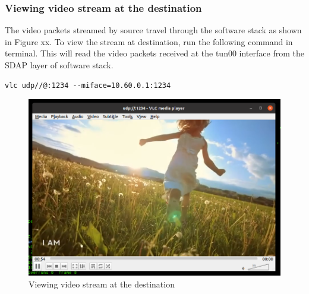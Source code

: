 \subsubsection{Viewing video stream at the destination}
The video packets streamed by source travel through the software stack as shown in Figure xx.
To view the stream at destination, run the following command in terminal. This will read the video packets received at the tun00 interface from the SDAP layer of software stack.
\begin{lstlisting}
vlc udp//@:1234 --miface=10.60.0.1:1234
\end{lstlisting}

\begin{figure}[h!]
\centering
\includegraphics[width=1.05\columnwidth]{./Figures/Destination_viewing_stream.png}
\caption{Viewing video stream at the destination}
\label{Destination_viewing_stream}
\end{figure}

